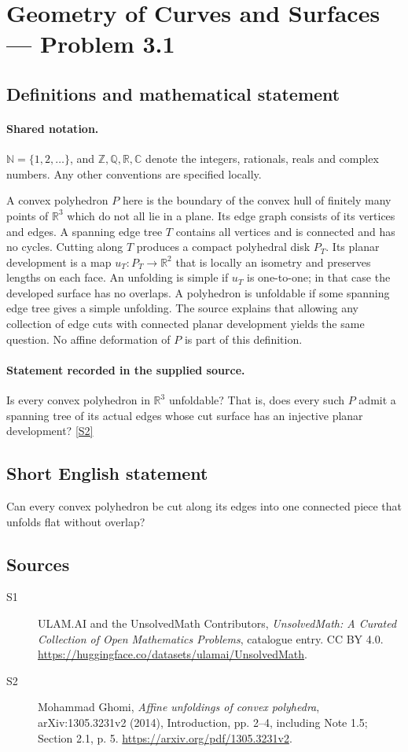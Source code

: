 \documentclass[11pt]{article}
\newcommand{\sref}[2]{\hyperlink{source:#1:#2}{[S#2]}}
\begin{document}
\section{Geometry of Curves and Surfaces — Problem 3.1}\label{statement}

\subsection{Definitions and mathematical statement}

\paragraph{Shared notation.}$\mathbb N=\{1,2,\ldots\}$, and $\mathbb Z,\mathbb Q,\mathbb R,\mathbb C$ denote the integers, rationals, reals and complex numbers. Any other conventions are specified locally.


A convex polyhedron $P$ here is the boundary of the convex hull of finitely many points of $\mathbb R^3$ which do not all lie in a plane. Its edge graph consists of its vertices and edges. A spanning edge tree $T$ contains all vertices and is connected and has no cycles. Cutting along $T$ produces a compact polyhedral disk $P_T$. Its planar development is a map $u_T:P_T\to\mathbb R^2$ that is locally an isometry and preserves lengths on each face. An unfolding is simple if $u_T$ is one-to-one; in that case the developed surface has no overlaps. A polyhedron is unfoldable if some spanning edge tree gives a simple unfolding. The source explains that allowing any collection of edge cuts with connected planar development yields the same question. No affine deformation of $P$ is part of this definition.
\paragraph{Statement recorded in the supplied source.}
Is every convex polyhedron in $\mathbb R^3$ unfoldable? That is, does every such $P$ admit a spanning tree of its actual edges whose cut surface has an injective planar development? \sref{statement}{2}
\subsection{Short English statement}
Can every convex polyhedron be cut along its edges into one connected piece that unfolds flat without overlap?
\subsection{Sources}
\begin{description}
\item[\hypertarget{source:statement:1}{S1}] ULAM.AI and the UnsolvedMath Contributors, \emph{UnsolvedMath: A Curated Collection of Open Mathematics Problems}, catalogue entry. CC BY 4.0. \url{https://huggingface.co/datasets/ulamai/UnsolvedMath}.
\item[\hypertarget{source:statement:2}{S2}] Mohammad Ghomi, \emph{Affine unfoldings of convex polyhedra}, arXiv:1305.3231v2 (2014), Introduction, pp. 2--4, including Note 1.5; Section 2.1, p. 5. \url{https://arxiv.org/pdf/1305.3231v2}.
\end{description}
\label{end:statement}
\end{document}

